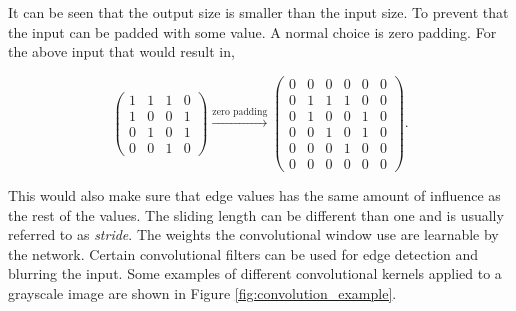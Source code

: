 \begin{description}
        It can be seen that the output size is smaller than the input size. To
        prevent that the input can be padded with some value. A normal choice is
        zero padding. For the above input that would result in,

        \begin{equation}
            \begin{pmatrix}
                1 & 1 & 1 & 0 \\
                1 & 0 & 0 & 1 \\
                0 & 1 & 0 & 1 \\
                0 & 0 & 1 & 0
            \end{pmatrix} \xrightarrow{\text{zero padding}}
            \begin{pmatrix}
                0 & 0 & 0 & 0 & 0 & 0 \\
                0 & 1 & 1 & 1 & 0 & 0 \\
                0 & 1 & 0 & 0 & 1 & 0 \\
                0 & 0 & 1 & 0 & 1 & 0 \\
                0 & 0 & 0 & 1 & 0 & 0 \\
                0 & 0 & 0 & 0 & 0 & 0
            \end{pmatrix}.
        \end{equation}

        This would also make sure that edge values has the same amount of
        influence as the rest of the values. The sliding length can be different
        than one and is usually referred to as \textit{stride}. The weights
        the convolutional window use are learnable by the network. Certain
        convolutional filters can be used for edge detection and blurring the
        input. Some examples of different convolutional kernels applied to a
        grayscale image are shown in Figure \ref{fig:convolution_example}.


\end{description}
